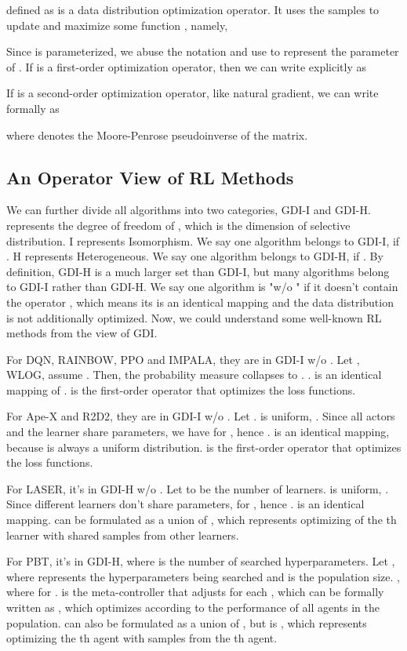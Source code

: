 \documentclass[nohyperref]{article}
\theoremstyle{plain}
\begin{document}
 defined as  
is a data distribution optimization operator.
It uses the samples  to update  and maximize some function , namely,

Since  is parameterized,  we abuse the notation and use  to represent the parameter of .
If  is a first-order optimization operator, then we can write  explicitly as

If  is a second-order optimization operator, like natural gradient, we can write  formally as

where  denotes the Moore-Penrose pseudoinverse of the matrix.

\subsection{An Operator View of RL Methods}
\label{sec: An Operator View of RL Methods}
We can further divide all algorithms into two categories, GDI-I and GDI-H.
 represents the degree of freedom of , which is the dimension of selective distribution.
I represents Isomorphism. 
We say one algorithm belongs to GDI-I, if .
H represents Heterogeneous.
We say one algorithm belongs to GDI-H, if .
By definition, GDI-H is a much larger set than GDI-I, but many algorithms belong to GDI-I rather than GDI-H.
We say one algorithm is "w/o " if it doesn't contain the operator , which means its  is an identical mapping and the data distribution is not additionally optimized. 
Now, we could understand some well-known RL methods from the view of GDI.



For DQN, RAINBOW, PPO and IMPALA, they are in GDI-I w/o . Let , WLOG, assume .
Then, the probability measure  collapses to . 
.
 is an identical mapping of .
 is the first-order operator that optimizes the loss functions.

For Ape-X and R2D2, they are in GDI-I w/o . 
Let .
 is uniform, .
Since all actors and the learner share parameters, we have  for , hence .
 is an identical mapping, because  is always a uniform distribution.
 is the first-order operator that optimizes the loss functions.

For LASER, it's in GDI-H w/o . 
Let  to be the number of learners.
 is uniform, .
Since different learners don't share parameters,  for , hence .
 is an identical mapping.
 can be formulated as a union of , 
which represents optimizing  of the th learner with shared samples from other learners.

For PBT, it's in GDI-H, where  is the number of  searched hyperparameters.
Let , where  represents the hyperparameters being searched and  is the population size.
, where  for .
 is the meta-controller that adjusts  for each , which can be formally written as 
,
which optimizes  according to the performance of all agents in the population.
 can also be formulated as a union of , but is 
,
which represents optimizing the th agent with samples from the th agent.
\end{document}
